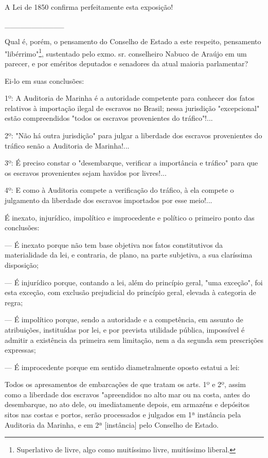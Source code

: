 A Lei de 1850 confirma perfeitamente esta exposição!

\_\_\_\_\_\_\_\_\_\_\_

Qual é, porém, o pensamento do Conselho de Estado a este respeito,
pensamento "libérrimo"\footnote{Superlativo de livre, algo como
  muitíssimo livre, muitíssimo liberal.}, sustentado pelo exmo. sr.
conselheiro Nabuco de Araújo em um parecer, e por eméritos deputados e
senadores da atual maioria parlamentar?

Ei-lo em suas conclusões:

1º: A Auditoria de Marinha é a autoridade competente para conhecer dos
fatos relativos à importação ilegal de escravos no Brasil; nessa
jurisdição "excepcional" estão compreendidos "todos os escravos
provenientes do tráfico"!...

2º: "Não há outra jurisdição" para julgar a liberdade dos escravos
provenientes do tráfico senão a Auditoria de Marinha!...

3º: É preciso constar o "desembarque, verificar a importância e tráfico"
para que os escravos provenientes sejam havidos por livres!...

4º: E como à Auditoria compete a verificação do tráfico, à ela compete o
julgamento da liberdade dos escravos importados por esse meio!...

É inexato, injurídico, impolítico e improcedente e político o primeiro
ponto das conclusões:

--- É inexato porque não tem base objetiva nos fatos constitutivos da
materialidade da lei, e contraria, de plano, na parte subjetiva, a sua
claríssima disposição;

--- É injurídico porque, contando a lei, além do princípio geral, "uma
exceção", foi esta exceção, com exclusão prejudicial do princípio geral,
elevada à categoria de regra;

--- É impolítico porque, sendo a autoridade e a competência, em assunto
de atribuições, instituídas por lei, e por prevista utilidade pública,
impossível é admitir a existência da primeira sem limitação, nem a da
segunda sem prescrições expressas;

--- É improcedente porque em sentido diametralmente oposto estatui a
lei:

Todos os apresamentos de embarcações de que tratam os arts. 1º e 2º,
assim como a liberdade dos escravos "apreendidos no alto mar ou na
costa, antes do desembarque, no ato dele, ou imediatamente depois, em
armazéns e depósitos sitos nas costas e portos, serão processados e
julgados em 1ª instância pela Auditoria da Marinha, e em 2ª
{[}instância{]} pelo Conselho de Estado.

